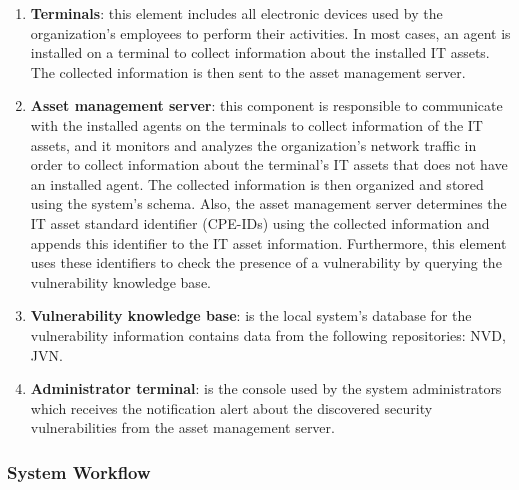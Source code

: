 \documentclass{llncs}
\begin{document}
 \begin{enumerate}
 \item \textbf{Terminals}: this element includes all electronic devices used by the organization's employees to perform their  activities. In most cases, an agent is installed on a terminal to collect information about the installed IT assets. The collected information is then sent to the asset management server.
 
 \item \textbf{Asset management server}: this component is responsible to communicate with the installed agents on the terminals to collect information of the IT assets, and it monitors and analyzes the organization's network traffic in order to collect information about the terminal's IT assets that does not have an installed agent. The collected information is then organized and stored using the system's schema. Also, the asset management server determines the IT asset standard identifier (CPE-IDs) using the collected information and appends this identifier to the  IT asset information. Furthermore, this element uses these identifiers to check the presence of a vulnerability by querying the vulnerability knowledge base.
 
 \item \textbf{Vulnerability knowledge base}: is the local system's database for the vulnerability information contains data from  the following repositories: NVD, JVN.
 
 
  \item \textbf{Administrator terminal}: is the console used by the system administrators which receives the notification alert about the discovered security vulnerabilities from the asset management server.     
 \end{enumerate}
 

\subsubsection{System Workflow }
\end{document}
